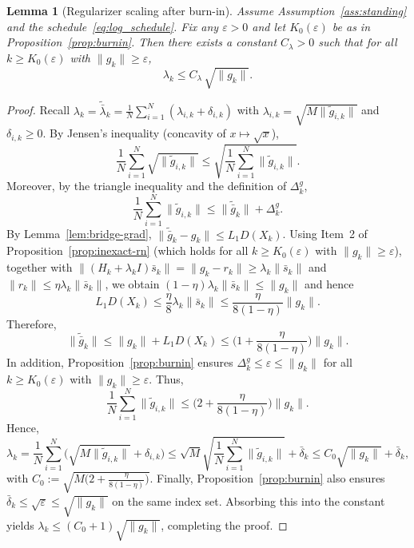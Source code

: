 \documentclass[11pt,a4paper]{article}
\newtheorem{lemma}[theorem]{Lemma}
\begin{document}
\begin{lemma}[Regularizer scaling after burn-in]\label{lem:lambda_scaling}
Assume Assumption~\ref{ass:standing} and the schedule~\eqref{eq:log_schedule}.
Fix any $\varepsilon>0$ and let $K_0(\varepsilon)$ be as in Proposition~\ref{prop:burnin}.
Then there exists a constant $C_\lambda>0$ such that for all $k\ge K_0(\varepsilon)$ with $\|g_k\|\ge \varepsilon$,
\[
\lambda_k\le C_\lambda\,\sqrt{\|g_k\|}.
\]
\end{lemma}
\begin{proof}
Recall $\lambda_k=\tilde{\bar\lambda}_k=\frac1N\sum_{i=1}^N(\lambda_{i,k}+\delta_{i,k})$ with
$\lambda_{i,k}=\sqrt{M\|\tilde g_{i,k}\|}$ and $\delta_{i,k}\ge 0$.
By Jensen's inequality (concavity of $x\mapsto\sqrt{x}$),
\[
\frac1N\sum_{i=1}^N \sqrt{\|\tilde g_{i,k}\|}
\le \sqrt{\frac1N\sum_{i=1}^N \|\tilde g_{i,k}\|}.
\]
Moreover, by the triangle inequality and the definition of $\Delta_k^g$,
\[
\frac1N\sum_{i=1}^N \|\tilde g_{i,k}\|
\le \|\tilde{\bar g}_k\|+\Delta_k^g.
\]
By Lemma~\ref{lem:bridge-grad}, $\|\tilde{\bar g}_k-g_k\|\le L_1D(X_k)$.
Using Item~2 of Proposition~\ref{prop:inexact-rn} (which holds for all $k\ge K_0(\varepsilon)$ with $\|g_k\|\ge \varepsilon$),
together with $\|(H_k+\lambda_k I)\bar s_k\|=\|g_k-r_k\|\ge \lambda_k\|\bar s_k\|$ and $\|r_k\|\le \eta\lambda_k\|\bar s_k\|$,
we obtain $(1-\eta)\lambda_k\|\bar s_k\|\le \|g_k\|$ and hence
\[
L_1D(X_k)\le \frac{\eta}{8}\lambda_k\|\bar s_k\|\le \frac{\eta}{8(1-\eta)}\|g_k\|.
\]
Therefore,
\[
\|\tilde{\bar g}_k\|\le \|g_k\|+L_1D(X_k)\le \Big(1+\frac{\eta}{8(1-\eta)}\Big)\|g_k\|.
\]
In addition, Proposition~\ref{prop:burnin} ensures $\Delta_k^g\le \varepsilon\le \|g_k\|$ for all $k\ge K_0(\varepsilon)$ with $\|g_k\|\ge \varepsilon$.
Thus,
\[
\frac1N\sum_{i=1}^N \|\tilde g_{i,k}\|
\le \Big(2+\frac{\eta}{8(1-\eta)}\Big)\|g_k\|.
\]
Hence,
\[
\lambda_k
= \frac1N\sum_{i=1}^N\big(\sqrt{M\|\tilde g_{i,k}\|}+\delta_{i,k}\big)
\le \sqrt{M}\sqrt{\frac1N\sum_{i=1}^N \|\tilde g_{i,k}\|}+\bar\delta_k
\le C_0\sqrt{\|g_k\|}+\bar\delta_k,
\]
with $C_0:=\sqrt{M\big(2+\frac{\eta}{8(1-\eta)}\big)}$.
Finally, Proposition~\ref{prop:burnin} also ensures $\bar\delta_k\le \sqrt{\varepsilon}\le \sqrt{\|g_k\|}$ on the same index set.
Absorbing this into the constant yields $\lambda_k\le (C_0+1)\sqrt{\|g_k\|}$, completing the proof.
\end{proof}
\end{document}
